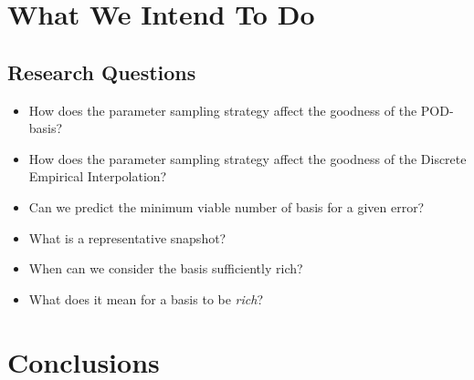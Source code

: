 \documentclass[../main.tex]{subfiles}
\begin{document}
\section{What We Intend To Do}

\subsection{Research Questions}

\begin{itemize}
    \item How does the parameter sampling strategy affect the goodness of the POD-basis?
    \item How does the parameter sampling strategy affect the goodness of the Discrete Empirical Interpolation?
    \item Can we predict the minimum viable number of basis for a given error?
    \item What is a representative snapshot?
    \item When can we consider the basis sufficiently rich?
    \item What does it mean for a basis to be \textit{rich}? 
\end{itemize}

\section{Conclusions}
\label{sec:conclusions}

\printbibliography
\end{document}
